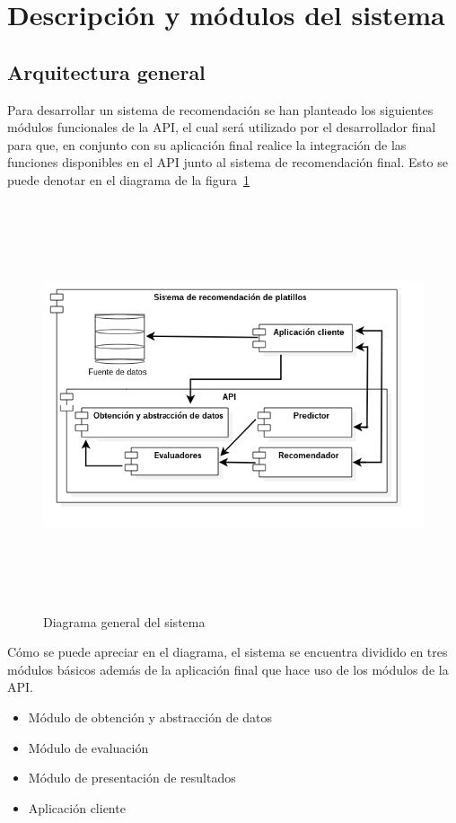 \section {Descripción y módulos del sistema}

  \subsection{Arquitectura general}
    Para desarrollar un sistema de recomendación se han planteado los siguientes módulos funcionales de la API, el cual será utilizado por el desarrollador final para que, en conjunto con su aplicación final realice la integración de las funciones disponibles en el API junto al sistema de recomendación final. Esto se puede denotar en el diagrama de la figura~\ref{fig:architecture}

\newpage
    \begin{landscape}
      \begin{figure}[h!]
      \centering
      \includegraphics[width=22.5cm,height=12cm]{./images/architecture.png}
      \caption{Diagrama general del sistema}
      \label{fig:architecture}
    \end{figure}
    \end{landscape}
  \newpage

Cómo se puede apreciar en el diagrama, el sistema se encuentra dividido en tres módulos básicos además de la aplicación final que hace uso de los módulos de la API.
    \begin{itemize}
    \item Módulo de obtención y abstracción de datos
    \item Módulo de evaluación
    \item Módulo de presentación de resultados
    \item Aplicación cliente
  \end{itemize}

